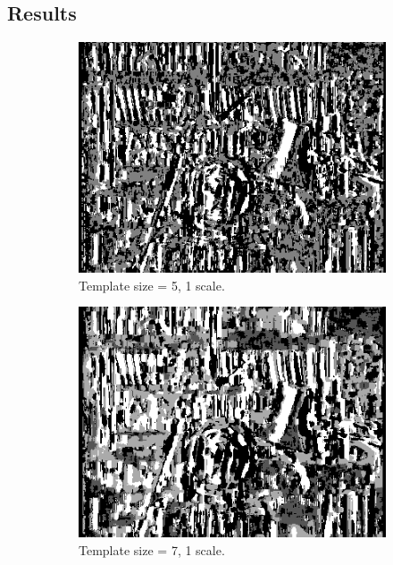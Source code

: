 \documentclass[12pt,a4paper,oneside,final]{article}
\begin{document}
\subsection{Results}
\begin{figure}[H]
\centering
\begin{subfigure}[b]{0.24\textwidth}
	\includegraphics[width=\textwidth]{disparity_s1_k5.png}
	\caption{Template size = 5, 1 scale.}
\end{subfigure}
\begin{subfigure}[b]{0.24\textwidth}
	\includegraphics[width=\textwidth]{disparity_s1_k7.png}
	\caption{Template size = 7, 1 scale.}
\end{subfigure}
\begin{subfigure}[b]{0.24\textwidth}

\end{subfigure}
\end{figure}
\end{document}

